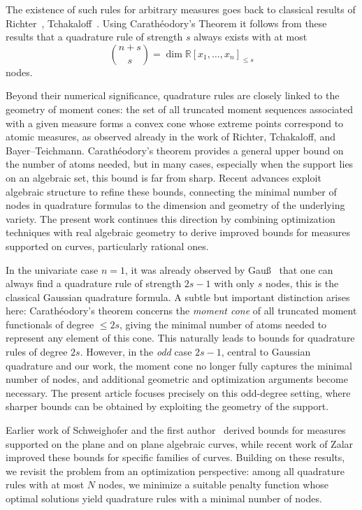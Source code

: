 \documentclass[11pt,a4paper]{amsart}
\numberwithin{equation}{section}
\theoremstyle{definition}
\newcommand{\R}{\mathbb{R}}
\numberwithin{thm}{section}
\theoremstyle{break}
\numberwithin{subcase}{case}
\begin{document}
The existence of such rules for arbitrary measures goes back to classical results of Richter~\cite{RS}, Tchakaloff~\cite{tchakaloff1957formules}. Using Carathéodory’s Theorem it follows from these results that a quadrature rule of strength $s$ always exists with at most  
\[
\binom{n+s}{s} = \dim \R[x_1,\ldots,x_n]_{\leq s}
\]
nodes.  

Beyond their numerical significance, quadrature rules are closely linked to the geometry of moment cones: the set of all truncated moment sequences associated with a given measure forms a convex cone whose extreme points correspond to atomic measures, as observed already in the work of Richter, Tchakaloff, and Bayer--Teichmann. Carathéodory’s theorem provides a general upper bound on the number of atoms needed, but in many cases, especially when the support lies on an algebraic set, this bound is far from sharp. Recent advances exploit algebraic structure to refine these bounds, connecting the minimal number of nodes in quadrature formulas to the dimension and geometry of the underlying variety. The present work continues this direction by combining optimization techniques with real algebraic geometry to derive improved bounds for measures supported on curves, particularly rational ones.  

In the univariate case $n=1$, it was already observed by Gauß~\cite{gauss1815methodvs} that one can always find a quadrature rule of strength $2s-1$ with only $s$ nodes, this is the classical Gaussian quadrature formula. A subtle but important distinction arises here: Carathéodory’s theorem concerns the \emph{moment cone} of all truncated moment functionals of degree $\leq 2s$, giving the minimal number of atoms needed to represent any element of this cone. This naturally leads to bounds for quadrature rules of degree $2s$. However, in the \emph{odd} case $2s-1$, central to Gaussian quadrature and our work, the moment cone no longer fully captures the minimal number of nodes, and additional geometric and optimization arguments become necessary. The present article focuses precisely on this odd-degree setting, where sharper bounds can be obtained by exploiting the geometry of the support.  

Earlier work of Schweighofer and the first author~\cite{RS} derived bounds for measures supported on the plane and on plane algebraic curves, while recent work of Zalar~\cite{zalar} improved these bounds for specific families of curves. Building on these results, we revisit the problem from an optimization perspective: among all quadrature rules with at most $N$ nodes, we minimize a suitable penalty function whose optimal solutions yield quadrature rules with a minimal number of nodes.  
\end{document}
